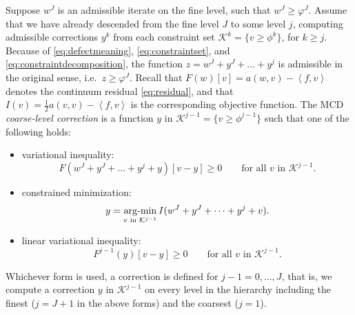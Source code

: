\documentclass[letterpaper,final,12pt,reqno]{amsart}
\theoremstyle{claim}
\newcommand{\ip}[2]{\left<#1,#2\right>}
\numberwithin{equation}{section}
\numberwithin{figure}{section}
\numberwithin{table}{section}
\numberwithin{theorem}{section}
\begin{document}
Suppose $w^J$ is an admissible iterate on the fine level, such that $w^J\ge \varphi^J$.  Assume that we have already descended from the fine level $J$ to some level $j$, computing admissible corrections $y^k$ from each constraint set $\mathcal{K}^k=\{v\ge \phi^k\}$, for $k\ge j$.  Because of \eqref{eq:defectmeaning}, \eqref{eq:constraintset}, and \eqref{eq:constraintdecomposition}, the function $z = w^J+y^J+\dots+y^j$ is admissible in the original sense, i.e.~$z\ge \varphi^J$.  Recall that $F(w)[v] = a(w,v) - \ip{f}{v}$ denotes the continuum residual \eqref{eq:residual}, and that $I(v) = \frac{1}{2} a(v,v) - \ip{f}{v}$ is the corresponding objective function.  The MCD \emph{coarse-level correction} is a function $y$ in $\mathcal{K}^{j-1}=\{v\ge \phi^{j-1}\}$ such that one of the following holds:
\begin{itemize}
\item variational inequality:
\begin{equation}
  F(w^J+y^J+\dots+y^j+y)[v - y] \ge 0 \qquad \text{for all } v \text{ in } \mathcal{K}^{j-1}.  \label{eq:mcdvi}
\end{equation}
\item constrained minimization:
\begin{equation}
  y = \mathop{\mathrm{arg\text{-}min}}_{v \text{ in } \mathcal{K}^{j-1}} I(w^J+y^J+\dots+y^j+v).  \label{eq:mcdminimization}
\end{equation}
\item linear variational inequality:
\begin{equation}
  F^{j-1}(y)[v - y] \ge 0 \qquad \text{for all } v \text{ in } \mathcal{K}^{j-1}.   \label{eq:mcdvilinear}
\end{equation}
\end{itemize}
Whichever form is used, a correction is defined for $j-1=0,\dots,J$, that is, we compute a correction $y$ in $\mathcal{K}^{j-1}$ on every level in the hierarchy including the finest ($j=J+1$ in the above forms) and the coarsest ($j=1$).
\end{document}
